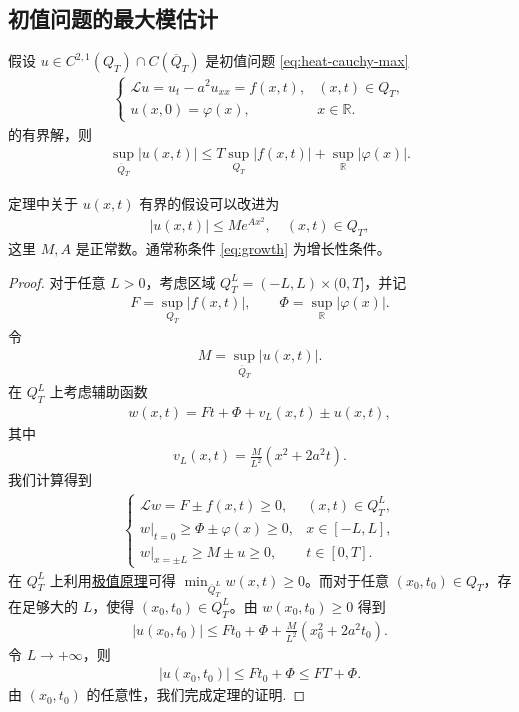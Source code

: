 \documentclass[../../main.tex]{subfiles}%
\begin{document}
\subsection{初值问题的最大模估计}

\begin{theorem}
假设 $u\in C^{2,1}(Q_T)\cap C(\overline{Q}_T)$ 是初值问题 \eqref{eq:heat-cauchy-max}
\begin{align}
\begin{cases}
\mathcal{L}u=u_t-a^2u_{xx}=f(x,t), & (x,t)\in Q_T,\\
u(x,0)=\varphi(x), & x\in\mathbb{R}.
\end{cases} \label{eq:heat-cauchy-max}
\end{align}
的有界解，则
\begin{align}
\sup_{\overline{Q}_T}|u(x,t)|\leqslant T\sup_{Q_T}|f(x,t)|+\sup_{\mathbb{R}}|\varphi(x)|. \label{eq:heat-max-cauchy}
\end{align}
\end{theorem}
\begin{remark}
定理中关于 $u(x,t)$ 有界的假设可以改进为
\begin{align}
|u(x,t)|\leqslant Me^{Ax^2},\quad (x,t)\in Q_T, \label{eq:growth}
\end{align}
这里 $M,A$ 是正常数。通常称条件 \eqref{eq:growth} 为增长性条件。
\end{remark}
\begin{proof}
对于任意 $L>0$，考虑区域 $Q_T^L=(-L,L)\times(0,T]$，并记
\begin{align*}
F=\sup_{Q_T}|f(x,t)|,\qquad \Phi=\sup_{\mathbb{R}}|\varphi(x)|.
\end{align*}
令
\begin{align*}
M=\sup_{\overline{Q}_T}|u(x,t)|.
\end{align*}
在 $Q_T^L$ 上考虑辅助函数
\begin{align*}
w(x,t)=Ft+\Phi+v_L(x,t)\pm u(x,t),
\end{align*}
其中
\begin{align*}
v_L(x,t)=\frac{M}{L^2}(x^2+2a^2t).
\end{align*}
我们计算得到
\begin{align*}
\begin{cases}
\mathcal{L}w=F\pm f(x,t)\geqslant 0, & (x,t)\in Q_T^L,\\
w|_{t=0}\geqslant \Phi\pm\varphi(x)\geqslant 0, & x\in[-L,L],\\
w|_{x=\pm L}\geqslant M\pm u\geqslant 0, & t\in[0,T].
\end{cases}
\end{align*}
在 $Q_T^L$ 上利用\hyperref[theorem:PDE极值原理]{极值原理}可得 $\min_{\overline{Q}_T^L}w(x,t)\geqslant 0$。而对于任意 $(x_0,t_0)\in Q_T$，存在足够大的 $L$，使得 $(x_0,t_0)\in Q_T^L$。由 $w(x_0,t_0)\geqslant 0$ 得到
\begin{align*}
|u(x_0,t_0)|\leqslant Ft_0+\Phi+\frac{M}{L^2}(x_0^2+2a^2t_0).
\end{align*}
令 $L\to+\infty$，则
\begin{align*}
|u(x_0,t_0)|\leqslant Ft_0+\Phi\leqslant FT+\Phi.
\end{align*}
由 $(x_0,t_0)$ 的任意性，我们完成定理的证明.
\end{proof}
\end{document}
